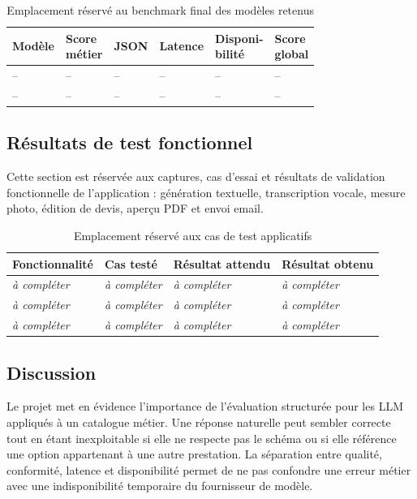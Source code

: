\begin{table}[H]
\centering
\caption{Emplacement réservé au benchmark final des modèles retenus}
\small
\setlength{\tabcolsep}{3pt}
\begin{tabular}{p{}p{}p{}p{}p{}p{}}
\toprule
\textbf{Modèle} & \shortstack{\textbf{Score}\\\textbf{métier}} & \textbf{JSON} & \textbf{Latence} & \shortstack{\textbf{Disponi-}\\\textbf{bilité}} & \shortstack{\textbf{Score}\\\textbf{global}} \\
\midrule
-- & -- & -- & -- & -- & -- \\
-- & -- & -- & -- & -- & -- \\
\bottomrule
\end{tabular}
\end{table}

\subsection{Résultats de test fonctionnel}
Cette section est réservée aux captures, cas d'essai et résultats de validation fonctionnelle de l'application : génération textuelle, transcription vocale, mesure photo, édition de devis, aperçu PDF et envoi email.

\begin{table}[H]
\centering
\caption{Emplacement réservé aux cas de test applicatifs}
\small
\setlength{\tabcolsep}{3pt}
\begin{tabular}{p{}p{}p{}p{}}
\toprule
\textbf{Fonctionnalité} & \textbf{Cas testé} & \textbf{Résultat attendu} & \textbf{Résultat obtenu} \\
\midrule
\textit{à compléter} & \textit{à compléter} & \textit{à compléter} & \textit{à compléter} \\
\textit{à compléter} & \textit{à compléter} & \textit{à compléter} & \textit{à compléter} \\
\textit{à compléter} & \textit{à compléter} & \textit{à compléter} & \textit{à compléter} \\
\bottomrule
\end{tabular}
\end{table}

\subsection{Discussion}
Le projet met en évidence l'importance de l'évaluation structurée pour les LLM appliqués à un catalogue métier. Une réponse naturelle peut sembler correcte tout en étant inexploitable si elle ne respecte pas le schéma ou si elle référence une option appartenant à une autre prestation. La séparation entre qualité, conformité, latence et disponibilité permet de ne pas confondre une erreur métier avec une indisponibilité temporaire du fournisseur de modèle.
